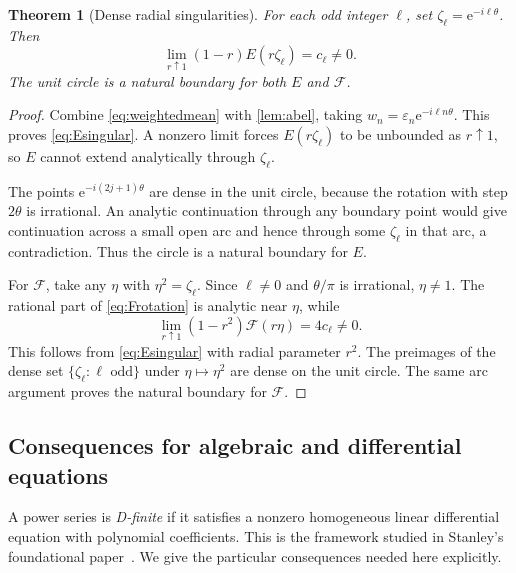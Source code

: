 \documentclass[11pt]{article}
\newtheorem{theorem}{Theorem}[section]
\theoremstyle{definition}\newtheorem{definition}[theorem]{Definition}
\theoremstyle{remark}\newtheorem{remark}[theorem]{Remark}
\newcommand{\eps}{\varepsilon}
\newcommand{\F}{\mathcal F}
\newcommand{\ee}{\mathrm e}
\begin{document}
\begin{theorem}[Dense radial singularities]\label{thm:natural}
For each odd integer $\ell$, set $\zeta_\ell=\ee^{-i\ell\theta}$. Then
\begin{equation}\label{eq:Esingular}
 \lim_{r\uparrow1}(1-r)E(r\zeta_\ell)=c_\ell\ne0.
\end{equation}
The unit circle is a natural boundary for both $E$ and $\F$.
\end{theorem}
\begin{proof}
Combine \eqref{eq:weightedmean} with \cref{lem:abel}, taking $w_n=\eps_n\ee^{-i\ell n\theta}$. This proves \eqref{eq:Esingular}. A nonzero limit forces $E(r\zeta_\ell)$ to be unbounded as $r\uparrow1$, so $E$ cannot extend analytically through $\zeta_\ell$.

The points $\ee^{-i(2j+1)\theta}$ are dense in the unit circle, because the rotation with step $2\theta$ is irrational. An analytic continuation through any boundary point would give continuation across a small open arc and hence through some $\zeta_\ell$ in that arc, a contradiction. Thus the circle is a natural boundary for $E$.

For $\F$, take any $\eta$ with $\eta^2=\zeta_\ell$. Since $\ell\ne0$ and $\theta/\pi$ is irrational, $\eta\ne1$. The rational part of \eqref{eq:Frotation} is analytic near $\eta$, while
\begin{equation}\label{eq:Fsingular}
 \lim_{r\uparrow1}(1-r^2)\F(r\eta)=4c_\ell\ne0.
\end{equation}
This follows from \eqref{eq:Esingular} with radial parameter $r^2$. The preimages of the dense set $\{\zeta_\ell:\ell\text{ odd}\}$ under $\eta\mapsto\eta^2$ are dense on the unit circle. The same arc argument proves the natural boundary for $\F$.
\end{proof}

\subsection{Consequences for algebraic and differential equations}

A power series is \emph{D-finite} if it satisfies a nonzero homogeneous linear differential equation with polynomial coefficients. This is the framework studied in Stanley's foundational paper~\cite{StanleyDFinite}. We give the particular consequences needed here explicitly.
\end{document}
